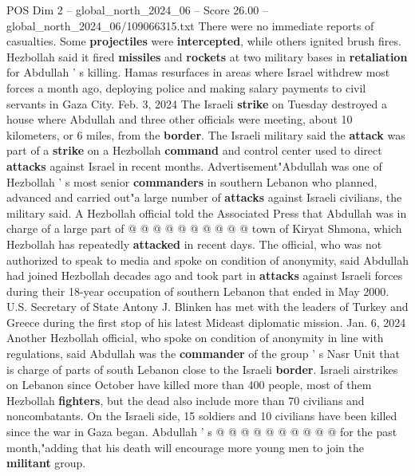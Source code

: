 \begin{textsample}{POS Dim 2 – global\_north\_2024\_06 – Score 26.00 – global\_north\_2024\_06/109066315.txt}
There were no immediate reports of casualties.
Some \textbf{projectiles} were \textbf{intercepted}, while others ignited brush fires.
Hezbollah said it fired \textbf{missiles} and \textbf{rockets} at two military bases in \textbf{retaliation} for Abdullah ' s killing.
Hamas resurfaces in areas where Israel withdrew most forces a month ago, deploying police and making salary payments to civil servants in Gaza City.
Feb. 3, 2024 The Israeli \textbf{strike} on Tuesday destroyed a house where Abdullah and three other officials were meeting, about 10 kilometers, or 6 miles, from the \textbf{border}.
The Israeli military said the \textbf{attack} was part of a \textbf{strike} on a Hezbollah \textbf{command} and control center used to direct \textbf{attacks} against Israel in recent months.
Advertisement"Abdullah was one of Hezbollah ' s most senior \textbf{commanders} in southern Lebanon who planned, advanced and carried out"a large number of \textbf{attacks} against Israeli civilians, the military said.
A Hezbollah official told the Associated Press that Abdullah was in charge of a large part of @ @ @ @ @ @ @ @ @ @ town of Kiryat Shmona, which Hezbollah has repeatedly \textbf{attacked} in recent days.
The official, who was not authorized to speak to media and spoke on condition of anonymity, said Abdullah had joined Hezbollah decades ago and took part in \textbf{attacks} against Israeli forces during their 18-year occupation of southern Lebanon that ended in May 2000.
U.S.
Secretary of State Antony J.
Blinken has met with the leaders of Turkey and Greece during the first stop of his latest Mideast diplomatic mission.
Jan. 6, 2024 Another Hezbollah official, who spoke on condition of anonymity in line with regulations, said Abdullah was the \textbf{commander} of the group ' s Nasr Unit that is charge of parts of south Lebanon close to the Israeli \textbf{border}.
Israeli airstrikes on Lebanon since October have killed more than 400 people, most of them Hezbollah \textbf{fighters}, but the dead also include more than 70 civilians and noncombatants.
On the Israeli side, 15 soldiers and 10 civilians have been killed since the war in Gaza began.
Abdullah ' s @ @ @ @ @ @ @ @ @ @ for the past month,"adding that his death will encourage more young men to join the \textbf{militant} group.

\end{textsample}
